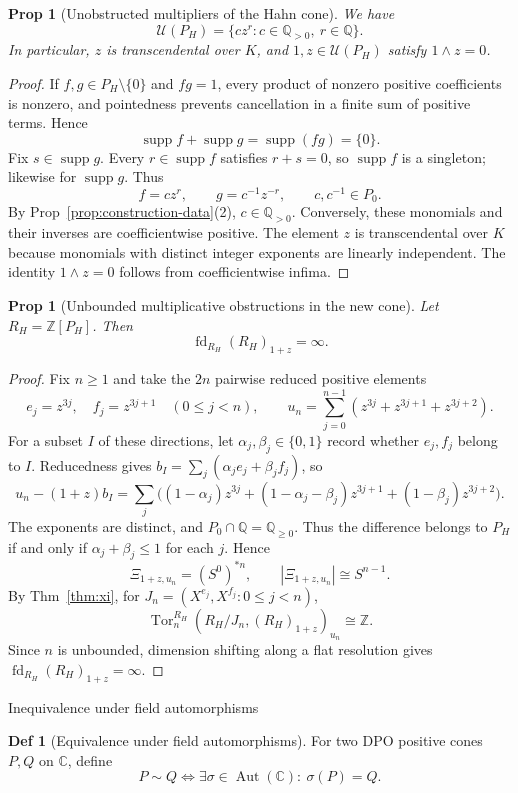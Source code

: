 \documentclass[10pt,letterpaper]{amsart}
\makeatletter
\numberwithin{equation}{section}
\newtheorem{prop}[thm]{Prop}
\theoremstyle{definition}
\newtheorem{defn}{Def}[section]
\newcommand{\Z}{\mathbb Z}
\newcommand{\Q}{\mathbb Q}
\newcommand{\C}{\mathbb C}
\newcommand{\Tor}{\operatorname{Tor}}
\newcommand{\fd}{\operatorname{fd}}
\newcommand{\supp}{\operatorname{supp}}
\def\subsection{\@startsection{subsection}{2}
  \z@{.9\linespacing\@plus.3\linespacing}{.4\linespacing}
  {\normalfont\fontsize{11.5}{14}\selectfont\bfseries\boldmath\raggedright}}
\makeatother
\begin{document}
\begin{prop}[Unobstructed multipliers of the Hahn cone]\label{prop:hahn-units}
We have
\[
\mathcal U(P_H)=\{cz^r:c\in\Q_{>0},\ r\in\Q\}.
\]
In particular, $z$ is transcendental over $K$, and $1,z\in\mathcal U(P_H)$ satisfy $1\wedge z=0$.
\end{prop}
\begin{proof}
If $f,g\in P_H\setminus\{0\}$ and $fg=1$, every product of nonzero positive coefficients is nonzero, and pointedness prevents cancellation in a finite sum of positive terms. Hence
\[
\supp f+\supp g=\supp(fg)=\{0\}.
\]
Fix $s\in\supp g$. Every $r\in\supp f$ satisfies $r+s=0$, so $\supp f$ is a singleton; likewise for $\supp g$. Thus
\[
f=cz^r,\qquad g=c^{-1}z^{-r},\qquad c,c^{-1}\in P_0.
\]
By Prop~\ref{prop:construction-data}(2), $c\in\Q_{>0}$. Conversely, these monomials and their inverses are coefficientwise positive. The element $z$ is transcendental over $K$ because monomials with distinct integer exponents are linearly independent. The identity $1\wedge z=0$ follows from coefficientwise infima.
\end{proof}

\begin{prop}[Unbounded multiplicative obstructions in the new cone]\label{prop:hahn-infinite}
Let $R_H=\Z[P_H]$. Then
\[
\fd_{R_H}(R_H)_{1+z}=\infty.
\]
\end{prop}
\begin{proof}
Fix $n\ge1$ and take the $2n$ pairwise reduced positive elements
\[
e_j=z^{3j},\quad f_j=z^{3j+1}\quad(0\le j<n),\qquad
u_n=\sum_{j=0}^{n-1}(z^{3j}+z^{3j+1}+z^{3j+2}).
\]
For a subset $I$ of these directions, let $\alpha_j,\beta_j\in\{0,1\}$ record whether $e_j,f_j$ belong to $I$. Reducedness gives $b_I=\sum_j(\alpha_je_j+\beta_jf_j)$, so
\[
u_n-(1+z)b_I
=\sum_j\bigl((1-\alpha_j)z^{3j}
+(1-\alpha_j-\beta_j)z^{3j+1}+(1-\beta_j)z^{3j+2}\bigr).
\]
The exponents are distinct, and $P_0\cap\Q=\Q_{\ge0}$. Thus the difference belongs to $P_H$ if and only if $\alpha_j+\beta_j\le1$ for each $j$. Hence
\[
\Xi_{1+z,u_n}=(S^0)^{*n},\qquad
|\Xi_{1+z,u_n}|\cong S^{n-1}.
\]
By Thm~\ref{thm:xi}, for $J_n=(X^{e_j},X^{f_j}:0\le j<n)$,
\[
\Tor_n^{R_H}(R_H/J_n,(R_H)_{1+z})_{u_n}\cong\Z.
\]
Since $n$ is unbounded, dimension shifting along a flat resolution gives $\fd_{R_H}(R_H)_{1+z}=\infty$.
\end{proof}

\subsection{Inequivalence under field automorphisms}
\begin{defn}[Equivalence under field automorphisms]\label{def:equivalence}
For two DPO positive cones $P,Q$ on $\C$, define
\[
P\sim Q\iff\exists\sigma\in\operatorname{Aut}(\C):\ \sigma(P)=Q.
\]
\end{defn}
\end{document}
